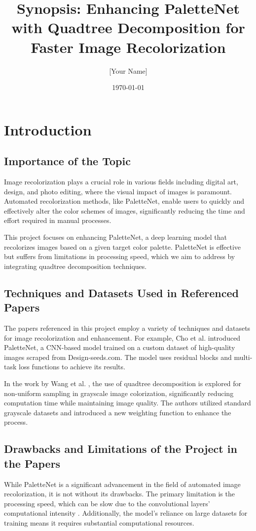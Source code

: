 \documentclass[12pt,a4paper]{report}
\title{Synopsis: Enhancing PaletteNet with Quadtree Decomposition for Faster Image Recolorization}
\author{[Your Name]}
\date{\today}
\begin{document}
\maketitle

\tableofcontents
\newpage

\section*{Introduction}

\subsection*{Importance of the Topic}
Image recolorization plays a crucial role in various fields including digital art, design, and photo editing, where the visual impact of images is paramount. Automated recolorization methods, like PaletteNet, enable users to quickly and effectively alter the color schemes of images, significantly reducing the time and effort required in manual processes.

This project focuses on enhancing PaletteNet, a deep learning model that recolorizes images based on a given target color palette. PaletteNet is effective but suffers from limitations in processing speed, which we aim to address by integrating quadtree decomposition techniques.

\subsection*{Techniques and Datasets Used in Referenced Papers}
The papers referenced in this project employ a variety of techniques and datasets for image recolorization and enhancement. For example, Cho et al. \cite{cho2017palettenet} introduced PaletteNet, a CNN-based model trained on a custom dataset of high-quality images scraped from Design-seeds.com. The model uses residual blocks and multi-task loss functions to achieve its results.

In the work by Wang et al. \cite{quadtree2024}, the use of quadtree decomposition is explored for non-uniform sampling in grayscale image colorization, significantly reducing computation time while maintaining image quality. The authors utilized standard grayscale datasets and introduced a new weighting function to enhance the process.

\subsection*{Drawbacks and Limitations of the Project in the Papers}
While PaletteNet is a significant advancement in the field of automated image recolorization, it is not without its drawbacks. The primary limitation is the processing speed, which can be slow due to the convolutional layers' computational intensity \cite{cho2017palettenet}. Additionally, the model's reliance on large datasets for training means it requires substantial computational resources.
\end{document}
